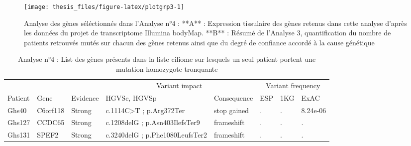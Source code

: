 \documentclass[12pt,twoside]{reedthesis}
\theoremstyle{definition}
\theoremstyle{definition}
\theoremstyle{remark}
\begin{document}
  \newpage  
  
  \begin{figure}
  
  {\centering \texttt{[image: thesis\_files/figure-latex/plotgrp3-1]} 
  
  }
  
  \caption[Analyse des gènes séléctionnés dans l'Analyse n°4]{Analyse des gènes séléctionnés dans l'Analyse n°4 : **A** : Expression tissulaire des gènes retenus dans cette analyse d'après les données du projet de transcriptome Illumina bodyMap. **B** : Résumé de l'Analyse 3, quantification du nombre de patients retrouvés mutés sur chacun des gènes retenus ainsi que du degré de confiance accordé à la cause génétique}\label{fig:plotgrp3}
  \end{figure}
  
  \newpage
  
  \begin{landscape}
  \begin{longtable}[t]{llllllll}
  \caption{\label{tab:tabgrp3high}Analyse n°4 : List des gènes présents dans la liste ciliome sur lesquels un seul patient portent une mutation homozygote tronquante}\\
  \toprule
  \multicolumn{1}{c}{ } & \multicolumn{1}{c}{ } & \multicolumn{1}{c}{ } & \multicolumn{2}{c}{Variant impact} & \multicolumn{3}{c}{Variant frequency} \\
  \cmidrule(l{2pt}r{2pt}){4-5} \cmidrule(l{2pt}r{2pt}){6-8}
  Patient & Gene & Evidence & HGVSc, HGVSp & Consequence & ESP & 1KG & ExAC\\
  \midrule
  Ghs40 & C6orf118 & Strong & c.1114C>T ; p.Arg372Ter & stop gained & . & . & 8.24e-06\\
  Ghs127 & CCDC65 & Strong & c.1208delG ; p.Asn403IlefsTer9 & frameshift & . & . & .\\
  Ghs131 & SPEF2 & Strong & c.3240delG ; p.Phe1080LeufsTer2 & frameshift & . & . & .\\
  \bottomrule
  \end{longtable}
  \end{landscape}
  
\end{document}
